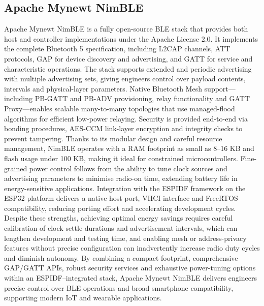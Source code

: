 \subsection{Apache Mynewt NimBLE}
Apache Mynewt NimBLE is a fully open-source \ac{BLE} stack that provides both host and controller implementations under the Apache License 2.0. It implements the complete Bluetooth 5 specification, including L2CAP channels, ATT protocols, GAP for device discovery and advertising, and \ac{GATT} for service and characteristic operations. The stack supports extended and periodic advertising with multiple advertising sets, giving engineers control over payload contents, intervals and physical-layer parameters. Native Bluetooth Mesh support—including PB-GATT and PB-ADV provisioning, relay functionality and GATT Proxy—enables scalable many-to-many topologies that use managed-flood algorithms for efficient low-power relaying. Security is provided end-to-end via bonding procedures, \ac{AES}-CCM link-layer encryption and integrity checks to prevent tampering. Thanks to its modular design and careful resource management, NimBLE operates with a RAM footprint as small as 8–16 KB and flash usage under 100 KB, making it ideal for constrained microcontrollers. Fine-grained power control follows from the ability to tune clock sources and advertising parameters to minimise radio-on time, extending battery life in energy-sensitive applications. Integration with the \ac{ESPIDF} framework on the ESP32 platform delivers a native host port, VHCI interface and \ac{FreeRTOS} compatibility, reducing porting effort and accelerating development cycles. Despite these strengths, achieving optimal energy savings requires careful calibration of clock-settle durations and advertisement intervals, which can lengthen development and testing time, and enabling mesh or address-privacy features without precise configuration can inadvertently increase radio duty cycles and diminish autonomy. By combining a compact footprint, comprehensive GAP/\ac{GATT} APIs, robust security services and exhaustive power-tuning options within an \ac{ESPIDF}–integrated stack, Apache Mynewt NimBLE delivers engineers precise control over \ac{BLE} operations and broad smartphone compatibility, supporting modern IoT and wearable applications\cite{nimble_1,nimble_2}.



